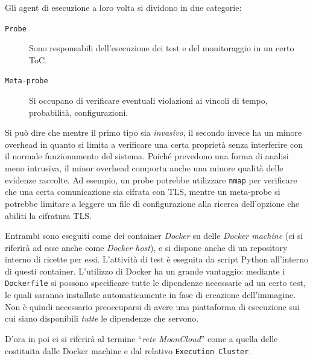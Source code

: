 Gli agent di esecuzione a loro volta si dividono in due categorie:
\begin{description}
	\item[\texttt{Probe}]Sono responsabili dell'esecuzione dei test e del
	monitoraggio in un certo ToC.
	\item[\texttt{Meta-probe}]Si occupano di verificare eventuali violazioni ai
	vincoli di tempo, probabilità, configurazioni. 
\end{description}
Si può dire che mentre il primo tipo sia \textit{invasivo}, il secondo invece
ha un minore overhead in quanto si limita a verificare una certa proprietà
senza interferire con il normale funzionamento del sistema.
Poiché prevedono una forma di analisi meno intrusiva, il minor overhead comporta
anche una minore qualità delle evidenze raccolte.
Ad esempio, un probe potrebbe utilizzare \texttt{nmap} per verificare che
una certa comunicazione sia cifrata con TLS, mentre un meta-probe si
potrebbe limitare a leggere un file di configurazione alla ricerca dell'opzione
che abiliti la cifratura TLS.

Entrambi sono eseguiti come dei container \textit{Docker} su delle \textit{Docker machine}
(ci si riferirà ad esse anche come \textit{Docker host}),
e si dispone anche di un repository interno di ricette per essi.
L'attività di test è eseguita da script Python all'interno di questi container.
L'utilizzo di Docker ha un grande vantaggio: mediante i \texttt{Dockerfile} si possono
specificare tutte le dipendenze necessarie ad un certo test, le quali saranno
installate automaticamente in fase di creazione dell'immagine. Non è quindi necessario
preoccuparsi di avere una piattaforma di esecuzione sui cui siano disponibili \textit{tutte}
le dipendenze che servono.

D'ora in poi ci si riferirà al termine ``\textit{rete MoonCloud}'' come a quella
delle costituita dalle Docker machine e dal relativo \texttt{Execution Cluster}.